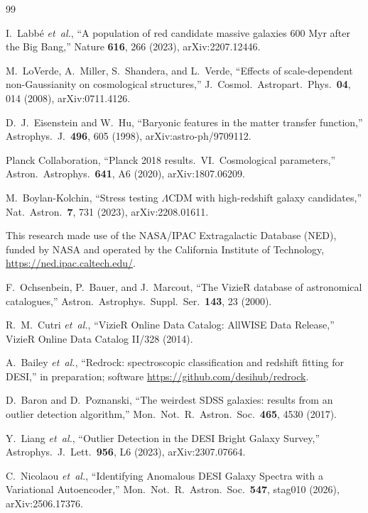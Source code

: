 \documentclass[aps,prd,twocolumn,superscriptaddress,nofootinbib,longbibliography,floatfix]{revtex4-2}
\newcommand{\etal}{\textit{et~al.}}
\begin{document}
\begin{thebibliography}{99}

 I.~Labb\'e \etal,
  ``A population of red candidate massive galaxies 600 Myr after the Big
  Bang,'' Nature \textbf{616}, 266 (2023), arXiv:2207.12446.

 M.~LoVerde, A.~Miller, S.~Shandera, and L.~Verde,
  ``Effects of scale-dependent non-Gaussianity on cosmological structures,''
  J.\ Cosmol.\ Astropart.\ Phys.\ \textbf{04}, 014 (2008), arXiv:0711.4126.

 D.~J.~Eisenstein and W.~Hu,
  ``Baryonic features in the matter transfer function,''
  Astrophys.\ J.\ \textbf{496}, 605 (1998), arXiv:astro-ph/9709112.

 Planck Collaboration,
  ``Planck 2018 results.\ VI.\ Cosmological parameters,''
  Astron.\ Astrophys.\ \textbf{641}, A6 (2020), arXiv:1807.06209.

 M.~Boylan-Kolchin,
  ``Stress testing $\Lambda$CDM with high-redshift galaxy candidates,''
  Nat.\ Astron.\ \textbf{7}, 731 (2023), arXiv:2208.01611.

 This research made use of the NASA/IPAC Extragalactic Database
  (NED), funded by NASA and operated by the California Institute of
  Technology, \url{https://ned.ipac.caltech.edu/}.

 F.~Ochsenbein, P.~Bauer, and J.~Marcout,
  ``The VizieR database of astronomical catalogues,'' Astron.\ Astrophys.\
  Suppl.\ Ser.\ \textbf{143}, 23 (2000).

 R.~M.~Cutri \etal,
  ``VizieR Online Data Catalog: AllWISE Data Release,'' VizieR Online Data
  Catalog II/328 (2014).

 A.~Bailey \etal,
  ``Redrock: spectroscopic classification and redshift fitting for DESI,''
  in preparation; software \url{https://github.com/desihub/redrock}.

 D.~Baron and D.~Poznanski,
  ``The weirdest SDSS galaxies: results from an outlier detection algorithm,''
  Mon.\ Not.\ R.\ Astron.\ Soc.\ \textbf{465}, 4530 (2017).

 Y.~Liang \etal,
  ``Outlier Detection in the DESI Bright Galaxy Survey,''
  Astrophys.\ J.\ Lett.\ \textbf{956}, L6 (2023), arXiv:2307.07664.

 C.~Nicolaou \etal,
  ``Identifying Anomalous DESI Galaxy Spectra with a Variational
  Autoencoder,'' Mon.\ Not.\ R.\ Astron.\ Soc.\ \textbf{547}, stag010 (2026),
  arXiv:2506.17376.


\end{thebibliography}
\end{document}
